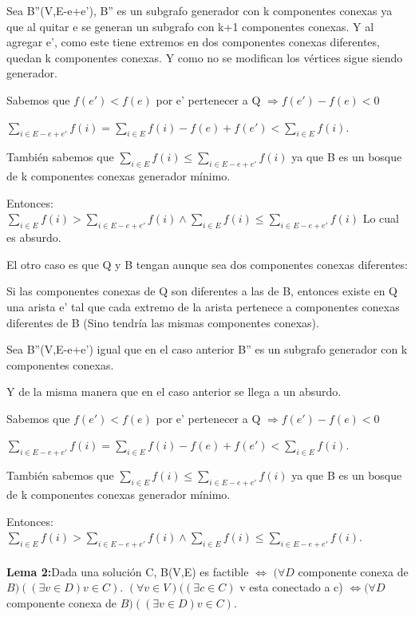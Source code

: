 Sea B''(V,E-e+e'), B'' es un subgrafo generador con k componentes conexas ya que al quitar e se generan un subgrafo con k+1 componentes conexas. Y al agregar e', como este  tiene extremos en dos componentes conexas diferentes, quedan k componentes conexas. Y como no se modifican los vértices sigue siendo generador.

Sabemos que $f(e') < f(e)$ por e' pertenecer a Q $\Rightarrow f(e') - f(e) < 0$

$\sum_{i \in E-e+e'} f(i) = \sum_{i \in E} f(i) - f(e) + f(e') < \sum_{i \in E} f(i)$.

También sabemos que $\sum_{i \in E} f(i) \leq \sum_{i \in E-e+e'} f(i)$ ya que B es un bosque de k componentes conexas generador mínimo.

Entonces: $\sum_{i \in E} f(i) > \sum_{i \in E-e+e'} f(i) \wedge \sum_{i \in E} f(i) \leq \sum_{i \in E-e+e'} f(i)$
Lo cual es absurdo.

El otro caso es que Q y B tengan aunque sea dos componentes conexas diferentes:

Si las componentes conexas de Q son diferentes a las de B, entonces existe en Q una arista e' tal que cada extremo de la arista pertenece a componentes conexas diferentes de B (Sino tendría las mismas componentes conexas).

Sea B''(V,E-e+e') igual que en el caso anterior B'' es un subgrafo generador con k componentes conexas.

Y de la misma manera que en el caso anterior se llega a un absurdo.

Sabemos que $f(e') < f(e)$ por e' pertenecer a Q $\Rightarrow f(e') - f(e) < 0$

$\sum_{i \in E-e+e'} f(i) = \sum_{i \in E} f(i) - f(e) + f(e') < \sum_{i \in E} f(i)$.

También sabemos que $\sum_{i \in E} f(i) \leq \sum_{i \in E-e+e'} f(i)$ ya que B es un bosque de k componentes conexas generador mínimo.

Entonces: $\sum_{i \in E} f(i) > \sum_{i \in E-e+e'} f(i) \wedge \sum_{i \in E} f(i) \leq \sum_{i \in E-e+e'} f(i)$. \\ \\


\textbf{Lema 2:}Dada una solución C, B(V,E) es factible $\Longleftrightarrow$ $(\forall D$ componente conexa de $B)((\exists v \in D) v \in C)$.  $(\forall v \in V)((\exists c \in C)$ v esta conectado a c) $\Leftrightarrow (\forall D$ componente conexa de $B)((\exists v \in D) v \in C)$.


